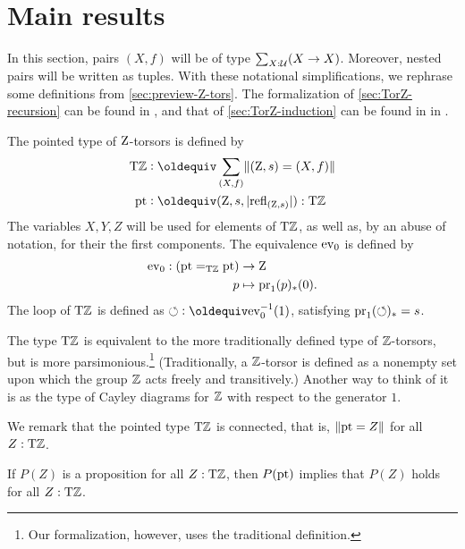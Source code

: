 \documentclass[a4paper,12pt]{amsart}
\begin{document}
\section{Main results}\label{sec:ZTorsors}

In this section, pairs $(X,f)$ will be of type $\sum_{X:\mathcal{U}}(X\to X)$.
Moreover, nested pairs will be written as tuples.
With these notational simplifications, we rephrase some definitions from
\cref{sec:preview-Z-tors}.
The formalization of \cref{sec:TorZ-recursion} can be found in \cite[\href{https://github.com/UniMath/UniMath/blob/master/UniMath/SyntheticHomotopyTheory/Circle.v}{Circle.v}]{UniMath},
and that of \cref{sec:TorZ-induction} can be found in in \cite[\href{https://github.com/UniMath/UniMath/blob/master/UniMath/SyntheticHomotopyTheory/Circle2.v}{Circle2.v}]{UniMath}.

\begin{definition}\label{def:TorZ}
  The pointed type of $\mathrm{Z}$-torsors is defined by
  \begin{align*}
    \TorZ &\defeq \sum_{(X,f)}\Trunc{(\zet,s)=(X,f)}  \\
    \pt & \defeq (\zet,s,\trunc{\refl{(\zet,s)}}) : \TorZ
  \end{align*}
  The variables $X,Y,Z$ will be used for elements of ${\mathrm{T}\mathbb{Z}}$,
  as well as, by an abuse of notation, for their the first components.
  The equivalence $\mathrm{ev}_0$ is defined by
  \begin{align*}
    \mathrm{ev}_0: ({\mathord{\mathrm{pt}}} =_{\mathrm{T}\mathbb{Z}} {\mathord{\mathrm{pt}}}) & \to\mathrm{Z} \\
    p & \mapsto \operatorname{pr}_1(p)_*(0).
  \end{align*}
  The loop of ${\mathrm{T}\mathbb{Z}}$ is defined as ${\Zloop}\defeq\ev_0^{-1}(1)$,
  satisfying $\operatorname{pr}_1({\circlearrowleft})_* = s$.
\end{definition}

The type ${\mathrm{T}\mathbb{Z}}$ is equivalent to the more traditionally defined
type of $\mathbb{Z}$-torsors, but is more parsimonious.\footnote{Our formalization, however, uses the traditional definition.}
(Traditionally, a $\mathbb{Z}$-torsor is defined as a nonempty set upon which the group $\mathbb{Z}$ acts freely and transitively.)
Another way to think of it is as the type of Cayley diagrams for $\mathbb{Z}$
with respect to the generator $1$.

We remark that the pointed type ${\mathrm{T}\mathbb{Z}}$ is connected, that is, $\lVert{\mathord{\mathrm{pt}}}=Z\rVert$ for all $Z:{\mathrm{T}\mathbb{Z}}$.


\begin{lemma}\label{lem:dep-elim-TorZ}
If $P(Z)$ is a proposition for all $Z:{\mathrm{T}\mathbb{Z}}$, then $P({\mathord{\mathrm{pt}}})$ implies that $P(Z)$ holds for all $Z:{\mathrm{T}\mathbb{Z}}$.
\end{lemma}
\end{document}
